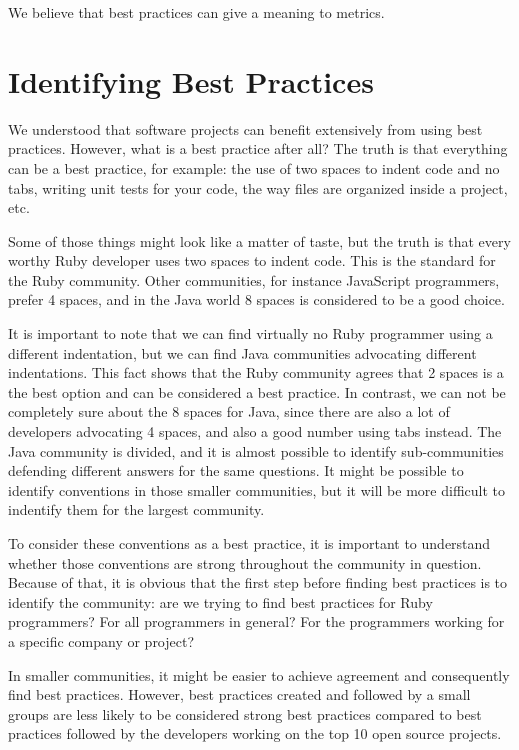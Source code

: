 We believe that best practices can give a meaning to metrics.

\section{Identifying Best Practices} \label{sec:identifying_best_practices}
We understood that software projects can benefit extensively from using best practices.
However, what is a best practice after all?
The truth is that everything can be a best practice, for example:
the use of two spaces to indent code and no tabs,
writing unit tests for your code,
the way files are organized inside a project, etc.

Some of those things might look like a matter of taste,
but the truth is that every worthy Ruby developer uses two spaces to indent code.
This is the standard for the Ruby community. 
Other communities, for instance JavaScript programmers, prefer 4 spaces,
and in the Java world 8 spaces is considered to be a good choice.

It is important to note
that we can find virtually no Ruby programmer using a different indentation, 
but we can find Java communities advocating different indentations.
This fact shows that the Ruby community agrees that 2 spaces is a the best option and
can be considered a best practice.
In contrast, we can not be completely sure about the 8 spaces for Java,
since there are also a lot of developers advocating 4 spaces, and also a good number using tabs instead.
The Java community is divided, and it is almost possible to identify sub-communities defending 
different answers for the same questions. 
It might be possible to identify conventions in those smaller communities, 
but it will be more difficult to indentify them for the largest community.

To consider these conventions as a best practice, it is important to understand whether those
conventions are strong throughout the community in question. 
Because of that, it is obvious that the first step before finding best practices is to identify the community:
are we trying to find best practices for Ruby programmers? For all programmers in general? 
For the programmers working for a specific company or project?

In smaller communities, it might be easier to achieve agreement and
consequently find best practices.
However, best practices created and followed by a small groups
are less likely to be considered strong best practices compared to 
best practices followed by the developers working on the top 10 open source projects.

